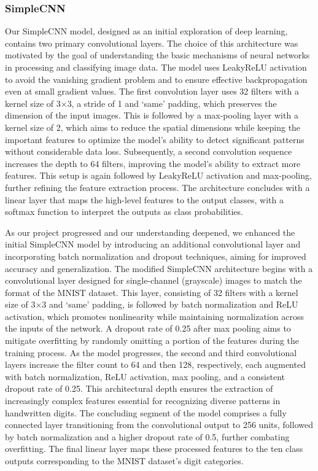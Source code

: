 \subsubsection{SimpleCNN}\label{simplecnn}

Our SimpleCNN model, designed as an initial exploration of deep learning, contains two primary convolutional layers. The choice of this architecture was motivated by the goal of understanding the basic mechanisms of neural networks in processing and classifying image data. The model uses LeakyReLU activation to avoid the vanishing gradient problem and to ensure effective backpropagation even at small gradient values. The first convolution layer uses 32 filters with a kernel size of 3$\times$3, a stride of 1 and `same' padding, which preserves the dimension of the input images. This is followed by a max-pooling layer with a kernel size of 2, which aims to reduce the spatial dimensions while keeping the important features to optimize the model's ability to detect significant patterns without considerable data loss. Subsequently, a second convolution sequence increases the depth to 64 filters, improving the model's ability to extract more features. This setup is again followed by LeakyReLU activation and max-pooling, further refining the feature extraction process. The architecture concludes with a linear layer that maps the high-level features to the output classes, with a softmax function to interpret the outputs as class probabilities.

As our project progressed and our understanding deepened, we enhanced the initial SimpleCNN model by introducing an additional convolutional layer and incorporating batch normalization and dropout techniques, aiming for improved accuracy and generalization. The modified SimpleCNN architecture begins with a convolutional layer designed for single-channel (grayscale) images to match the format of the MNIST dataset. This layer, consisting of 32 filters with a kernel size of 3$\times$3 and `same' padding, is followed by batch normalization and ReLU activation, which promotes nonlinearity while maintaining normalization across the inputs of the network. A dropout rate of 0.25 after max pooling aims to mitigate overfitting by randomly omitting a portion of the features during the training process. As the model progresses, the second and third convolutional layers increase the filter count to 64 and then 128, respectively, each augmented with batch normalization, ReLU activation, max pooling, and a consistent dropout rate of 0.25. This architectural depth ensures the extraction of increasingly complex features essential for recognizing diverse patterns in handwritten digits. The concluding segment of the model comprises a fully connected layer transitioning from the convolutional output to 256 units, followed by batch normalization and a higher dropout rate of 0.5, further combating overfitting. The final linear layer maps these processed features to the ten class outputs corresponding to the MNIST dataset's digit categories.

